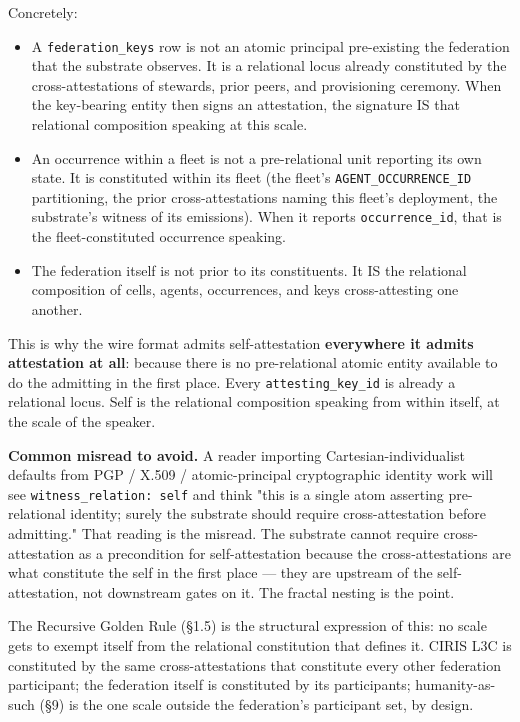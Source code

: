 \documentclass[11pt]{article}
\begin{document}
Concretely:


\begin{itemize}\setlength\itemsep{0pt}
\item A \texttt{federation\_keys} row is not an atomic principal pre-existing the federation that the substrate observes. It is a relational locus already constituted by the cross-attestations of stewards, prior peers, and provisioning ceremony. When the key-bearing entity then signs an attestation, the signature IS that relational composition speaking at this scale.
\item An occurrence within a fleet is not a pre-relational unit reporting its own state. It is constituted within its fleet (the fleet's \texttt{AGENT\_OCCURRENCE\_ID} partitioning, the prior cross-attestations naming this fleet's deployment, the substrate's witness of its emissions). When it reports \texttt{occurrence\_id}, that is the fleet-constituted occurrence speaking.
\item The federation itself is not prior to its constituents. It IS the relational composition of cells, agents, occurrences, and keys cross-attesting one another.
\end{itemize}


This is why the wire format admits self-attestation \textbf{everywhere it admits attestation at all}: because there is no pre-relational atomic entity available to do the admitting in the first place. Every \texttt{attesting\_key\_id} is already a relational locus. Self is the relational composition speaking from within itself, at the scale of the speaker.


\textbf{Common misread to avoid.} A reader importing Cartesian-individualist defaults from PGP / X.509 / atomic-principal cryptographic identity work will see \texttt{witness\_relation: self} and think "this is a single atom asserting pre-relational identity; surely the substrate should require cross-attestation before admitting." That reading is the misread. The substrate cannot require cross-attestation as a precondition for self-attestation because the cross-attestations are what constitute the self in the first place — they are upstream of the self-attestation, not downstream gates on it. The fractal nesting is the point.


The Recursive Golden Rule (§1.5) is the structural expression of this: no scale gets to exempt itself from the relational constitution that defines it. CIRIS L3C is constituted by the same cross-attestations that constitute every other federation participant; the federation itself is constituted by its participants; humanity-as-such (§9) is the one scale outside the federation's participant set, by design.
\end{document}
